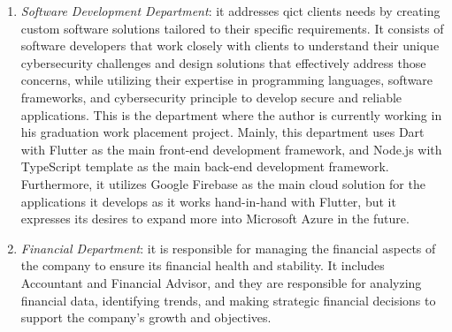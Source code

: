 \begin{multicols}{2}
\begin{enumerate}
            \item \textit{Software Development Department}: it addresses \acrshort{qict} clients needs by creating
                  custom software solutions tailored to their specific requirements. It consists of software
                  developers that work closely with clients to understand their unique cybersecurity challenges and
                  design solutions that effectively address those concerns, while utilizing their expertise in
                  programming languages, software frameworks, and cybersecurity principle to develop secure and
                  reliable applications. This is the department where the author is currently working in his
                  graduation work placement project. Mainly, this department uses Dart with Flutter as the main
                  front-end development framework, and Node.js with TypeScript template as the main back-end
                  development framework. Furthermore, it utilizes Google Firebase as the  main cloud solution for
                  the applications it develops as it works hand-in-hand with Flutter, but it expresses its
                  desires to expand more into Microsoft Azure in the future.
            \item \textit{Financial Department}: it is responsible for managing the financial aspects of the company
                  to ensure its financial health and stability. It includes Accountant and Financial Advisor, and
                  they are responsible for analyzing financial data, identifying trends, and making strategic
                  financial decisions to support the company's growth and objectives.
      \end{enumerate}

\end{multicols}
